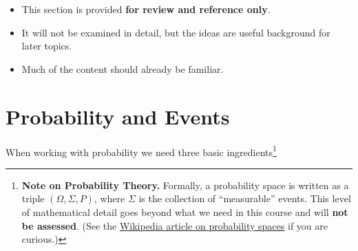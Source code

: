 \documentclass[
  letterpaper,
  DIV=11,
  numbers=noendperiod]{scrreprt}
\providecommand{\tightlist}{%
  \setlength{\itemsep}{0pt}\setlength{\parskip}{0pt}}
\theoremstyle{definition}
\theoremstyle{plain}
\theoremstyle{definition}
\theoremstyle{remark}
\begin{document}
\begin{tcolorbox}[enhanced jigsaw, left=2mm, toprule=.15mm, breakable, opacityback=0, titlerule=0mm, toptitle=1mm, colbacktitle=quarto-callout-warning-color!10!white, colframe=quarto-callout-warning-color-frame, coltitle=black, rightrule=.15mm, leftrule=.75mm, bottomrule=.15mm, arc=.35mm, bottomtitle=1mm, title=\textcolor{quarto-callout-warning-color}{\faExclamationTriangle}\hspace{0.5em}{Note on this section}, colback=white, opacitybacktitle=0.6]

\begin{itemize}
\tightlist
\item
  This section is provided \textbf{for review and reference only}.
\item
  It will not be examined in detail, but the ideas are useful background
  for later topics.\\
\item
  Much of the content should already be familiar.
\end{itemize}

\end{tcolorbox}

\section{Probability and Events}\label{probability-and-events}

When working with probability we need three basic ingredients\footnote{\textbf{Note
  on Probability Theory.} Formally, a probability space is written as a
  triple \((\Omega,\Sigma,P)\), where \(\Sigma\) is the collection of
  ``measurable'' events. This level of mathematical detail goes beyond
  what we need in this course and will \textbf{not be assessed}. (See
  the \href{https://en.wikipedia.org/wiki/Probability_space}{Wikipedia
  article on probability spaces} if you are curious.)}
\end{document}
